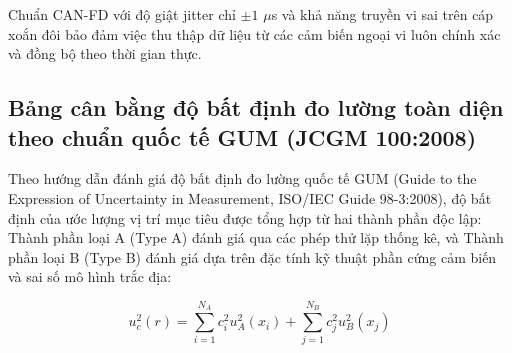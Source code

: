 \begin{table}[H]
\centering
\caption{So sánh các chuẩn giao tiếp nhúng thời gian thực cho trạm đo cơ động thực địa}
\label{tab:realtime-bus-comparison-table}
\end{table}

Chuẩn CAN-FD với độ giật jitter chỉ $\pm 1$ $\mu$s và khả năng truyền vi sai trên cáp xoắn đôi bảo đảm việc thu thập dữ liệu từ các cảm biến ngoại vi luôn chính xác và đồng bộ theo thời gian thực.

\subsection{Bảng cân bằng độ bất định đo lường toàn diện theo chuẩn quốc tế GUM (JCGM 100:2008)}

\hspace{0.5cm} Theo hướng dẫn đánh giá độ bất định đo lường quốc tế GUM (Guide to the Expression of Uncertainty in Measurement, ISO/IEC Guide 98-3:2008), độ bất định của ước lượng vị trí mục tiêu được tổng hợp từ hai thành phần độc lập: Thành phần loại A (Type A) đánh giá qua các phép thử lặp thống kê, và Thành phần loại B (Type B) đánh giá dựa trên đặc tính kỹ thuật phần cứng cảm biến và sai số mô hình trắc địa:

\begin{equation}
u_c^2(r) = \sum_{i=1}^{N_A} c_i^2 u_A^2(x_i) + \sum_{j=1}^{N_B} c_j^2 u_B^2(x_j)
\label{eq:gum-combined-uncertainty-formula-w15}
\end{equation}

